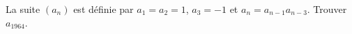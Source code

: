La suite $(a_n)$ est définie par $a_1 = a_2 = 1$, $a_3 = -1$ et $a_n = a_{n-1}a_{n-3}$. Trouver $a_{1964}$.
